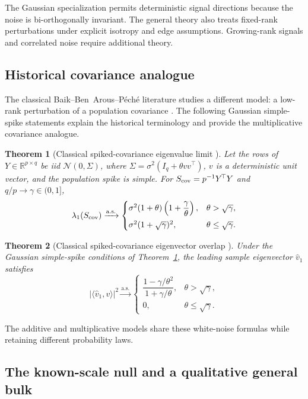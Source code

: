 \documentclass[11pt]{article}
\newtheorem{theorem}{Theorem}[section]
\theoremstyle{definition}
\theoremstyle{remark}
\newcommand{\R}{\mathbb{R}}
\newcommand{\inner}[2]{\langle #1, #2 \rangle}
\newcommand{\as}{\text{a.s.}}
\begin{document}
The Gaussian specialization permits deterministic signal directions because the noise
is bi-orthogonally invariant. The general theory also treats fixed-rank perturbations
under explicit isotropy and edge assumptions. Growing-rank signals and correlated noise
require additional theory.

\subsection{Historical covariance analogue}

The classical Baik--Ben~Arous--P\'ech\'e literature
\cite{bbp2005,baik2006,paul2007} studies a different model: a low-rank
perturbation of a population covariance \cite{johnstone2001}. The
following Gaussian simple-spike statements explain the historical terminology and
provide the multiplicative covariance analogue.

\begin{theorem}[Classical spiked-covariance eigenvalue limit
\cite{baik2006}]
\label{thm:bbp}
Let the rows of $Y\in\R^{p\times q}$ be iid
$\mathcal N(0,\Sigma)$, where
$\Sigma=\sigma^2(I_q+\theta vv^{\!\top})$, $v$ is a deterministic unit vector,
and the population spike is simple. For $S_{\rm cov}=p^{-1}Y^{\!\top}Y$ and
$q/p\to\gamma\in(0,1]$,
\[
  \lambda_1(S_{\rm cov})\xrightarrow{\as}
  \begin{cases}
    \sigma^2(1+\theta)\left(1+\dfrac{\gamma}{\theta}\right),
      & \theta>\sqrt\gamma,\\[1.4ex]
    \sigma^2(1+\sqrt\gamma)^2, & \theta\le\sqrt\gamma.
  \end{cases}
\]
\end{theorem}

\begin{theorem}[Classical spiked-covariance eigenvector overlap
\cite{paul2007}]
\label{thm:overlap}
Under the Gaussian simple-spike conditions of Theorem~\ref{thm:bbp}, the
leading sample eigenvector $\hat v_1$ satisfies
\[
  |\inner{\hat v_1}{v}|^2\xrightarrow{\as}
  \begin{cases}
    \dfrac{1-\gamma/\theta^2}{1+\gamma/\theta},
      & \theta>\sqrt\gamma,\\[1.4ex]
    0, & \theta\le\sqrt\gamma.
  \end{cases}
\]
\end{theorem}

The additive and multiplicative models share these white-noise formulas while
retaining different probability laws.

\subsection{The known-scale null and a qualitative general bulk}
\end{document}
